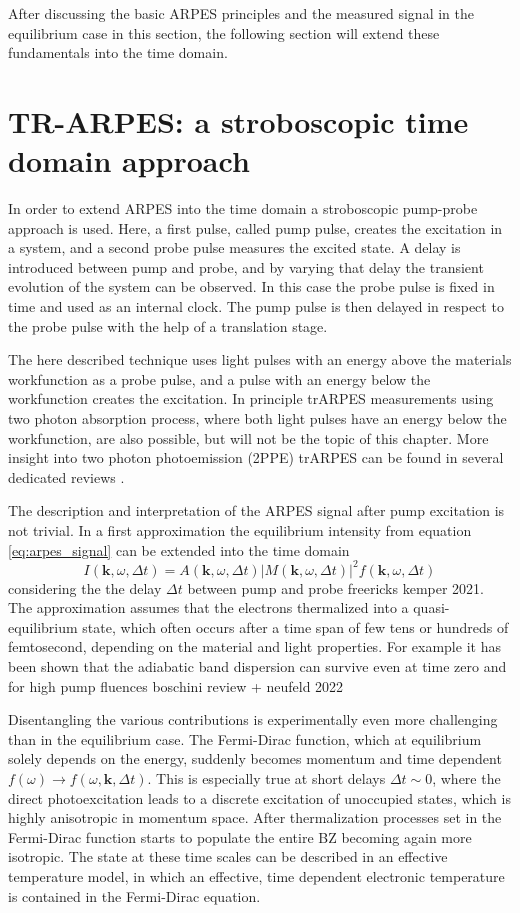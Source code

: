 After discussing the basic ARPES principles and the measured signal in the equilibrium case in this section, the following section will extend these fundamentals into the time domain.

\section{TR-ARPES: a stroboscopic time domain approach}

In order to extend ARPES into the time domain a stroboscopic pump-probe approach is used.
Here, a first pulse, called pump pulse, creates the excitation in a system, and a second probe pulse measures the excited state.
A delay is introduced between pump and probe, and by varying that delay the transient evolution of the system can be observed.
In this case the probe pulse is fixed in time and used as an internal clock.
The pump pulse is then delayed in respect to the probe pulse with the help of a translation stage.

The here described technique uses light pulses with an energy above the materials workfunction as a probe pulse, and a pulse with an energy below the workfunction creates the excitation.
In principle trARPES measurements using two photon absorption process, where both light pulses have an energy below the workfunction, are also possible, but will not be the topic of this chapter.
More insight into two photon photoemission (2PPE) trARPES can be found in several dedicated reviews \cite{}.

The description and interpretation of the ARPES signal after pump excitation is not trivial.
In a first approximation the equilibrium intensity from equation \ref{eq:arpes_signal} can be extended into the time domain
\begin{equation}
	I(\mathbf{k}, \omega, \Delta t) = A(\mathbf{k}, \omega, \Delta t)\left|M(\mathbf{k}, \omega, \Delta t)\right|^2f(\mathbf{k}, \omega, \Delta t)
\end{equation}
considering the the delay  $\Delta t$ between pump and probe \cite{} freericks kemper 2021.
The approximation assumes that the electrons thermalized into a quasi-equilibrium state, which often occurs after a time span of few tens or hundreds of femtosecond, depending on the material and light properties.
For example it has been shown that the adiabatic band dispersion can survive even at time zero and for high pump fluences \cite{} boschini review + neufeld 2022

Disentangling the various contributions is experimentally even more challenging than in the equilibrium case.
The Fermi-Dirac function, which at equilibrium solely depends on the energy, suddenly becomes momentum and time dependent $f(\omega) \rightarrow f(\omega, \mathbf{k}, \Delta t)$.
This is especially true at short delays $\Delta t \sim 0$, where the direct photoexcitation leads to a discrete excitation of unoccupied states, which is highly anisotropic in momentum space.
After thermalization processes set in the Fermi-Dirac function starts to populate the entire BZ becoming again more isotropic.
The state at these time scales can be described in an effective temperature model, in which an effective, time dependent electronic temperature is contained in the Fermi-Dirac equation.

